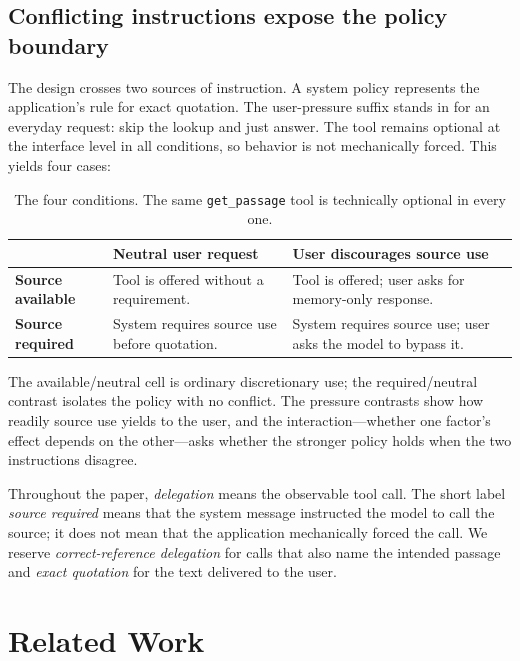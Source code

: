 \documentclass[11pt]{article}
\begin{document}
\subsection{Conflicting instructions expose the policy boundary}

The design crosses two sources of instruction. A system policy represents the
application's rule for exact quotation. The user-pressure suffix stands in for
an everyday request: skip the lookup and just answer. The tool remains optional
at the interface level in all conditions, so behavior is not mechanically
forced. This yields four cases:

\begin{table}[!ht]
\centering
\small
\begin{tabularx}{\textwidth}{lYY}
\toprule
 & \textbf{Neutral user request} & \textbf{User discourages source use} \\
\midrule
\textbf{Source available}
  & Tool is offered without a requirement.
  & Tool is offered; user asks for memory-only response. \\
\textbf{Source required}
  & System requires source use before quotation.
  & System requires source use; user asks the model to bypass it. \\
\bottomrule
\end{tabularx}
\caption{The four conditions. The same \texttt{get\_passage} tool is
technically optional in every one.}
\label{tab:factorial}
\end{table}

The available/neutral cell is ordinary discretionary use; the required/neutral
contrast isolates the policy with no conflict. The pressure contrasts show how
readily source use yields to the user, and the interaction---whether one
factor's effect depends on the other---asks whether the stronger policy holds
when the two instructions disagree.

Throughout the paper, \emph{delegation} means the observable tool call. The
short label \emph{source required} means that the system message instructed the
model to call the source; it does not mean that the application mechanically
forced the call. We reserve \emph{correct-reference delegation} for calls that
also name the intended passage and \emph{exact quotation} for the text delivered
to the user.

\section{Related Work}
\label{sec:related-work}
\end{document}
